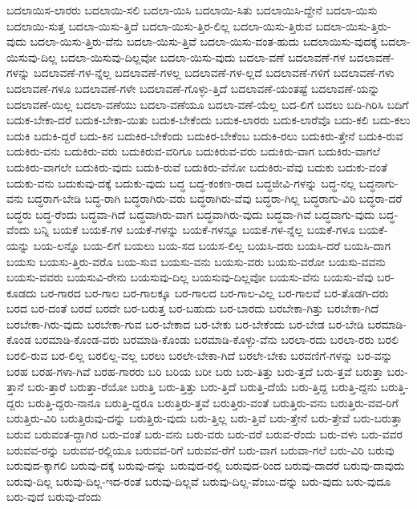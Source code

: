 {ಬದಲಾಯಿಸ-ಲಾರರು
ಬದಲಾಯಿ-ಸಲಿ
ಬದಲಾ-ಯಿಸಿ
ಬದಲಾಯಿ-ಸಿತು
ಬದಲಾಯಿಸಿ-ದ್ದೇನೆ
ಬದಲಾ-ಯಿಸು
ಬದಲಾಯಿ-ಸುತ್ತ
ಬದಲಾ-ಯಿಸು-ತ್ತಿದೆ
ಬದಲಾ-ಯಿಸು-ತ್ತಿರ-ಲಿಲ್ಲ
ಬದಲಾ-ಯಿಸು-ತ್ತಿರುವ
ಬದಲಾ-ಯಿಸು-ತ್ತಿರು-ವುದು
ಬದಲಾ-ಯಿಸು-ತ್ತಿರು-ವೆನು
ಬದಲಾ-ಯಿಸು-ತ್ತಿವೆ
ಬದಲಾ-ಯಿಸು-ವಂತ-ಹುದು
ಬದಲಾಯಿಸು-ವುದಕ್ಕೆ
ಬದಲಾ-ಯಿಸುವು-ದಿಲ್ಲ
ಬದಲಾ-ಯಿಸುವು-ದಿಲ್ಲವೋ
ಬದಲಾ-ಯಿಸು-ವುದು
ಬದಲಾ-ವಣೆ
ಬದಲಾವಣೆ-ಗಳ
ಬದಲಾವಣೆ-ಗಳನ್ನು
ಬದಲಾವಣೆ-ಗಳ-ನ್ನೆಲ್ಲ
ಬದಲಾವಣೆ-ಗಳಲ್ಲ
ಬದಲಾವಣೆ-ಗಳ-ಲ್ಲದೆ
ಬದಲಾವಣೆ-ಗಳಿಗೆ
ಬದಲಾವಣೆ-ಗಳು
ಬದಲಾವಣೆ-ಗಳೂ
ಬದಲಾವಣೆ-ಗಳೇ
ಬದಲಾವಣೆ-ಗೊಳ್ಳು-ತ್ತಿದೆ
ಬದಲಾವಣೆ-ಯಂತಷ್ಟೆ
ಬದಲಾವಣೆ-ಯನ್ನು
ಬದಲಾವಣೆ-ಯಿಲ್ಲ
ಬದಲಾ-ವಣೆಯು
ಬದಲಾ-ವಣೆಯೂ
ಬದಲಾ-ವಣೆ-ಯೆಲ್ಲ
ಬದ-ಲಿಗೆ
ಬದಲು
ಬದಿ-ಗಿರಿಸಿ
ಬದಿಗೆ
ಬದುಕ-ಬೇಕಾ-ದರೆ
ಬದುಕ-ಬೇಕಾ-ಯಿತು
ಬದುಕ-ಬೇಕೆಂದು
ಬದುಕ-ಲಾರರು
ಬದುಕ-ಲಾರೆವೊ
ಬದು-ಕಲಿ
ಬದು-ಕಲು
ಬದುಕಿ
ಬದುಕಿ-ದ್ದರೆ
ಬದು-ಕಿನ
ಬದುಕಿರ-ಬೇಕೆಂದು
ಬದುಕಿರ-ಬೇಕೆಂಬ
ಬದುಕಿ-ರಲು
ಬದುಕಿರು-ತ್ತೇನೆ
ಬದುಕಿ-ರುವ
ಬದುಕಿರು-ವನು
ಬದುಕಿರು-ವರು
ಬದುಕಿರುವ-ವರಿಗೂ
ಬದುಕಿರುವ-ವರು
ಬದುಕಿರು-ವಾಗ
ಬದುಕಿರು-ವಾಗಲೆ
ಬದುಕಿರು-ವಾಗಲೇ
ಬದುಕಿರು-ವುದು
ಬದುಕಿ-ರುವೆ
ಬದುಕಿರು-ವೆನೋ
ಬದುಕಿರು-ವೆವು
ಬದುಕು
ಬದುಕು-ವಂತೆ
ಬದುಕು-ವನು
ಬದುಕುವು-ದಕ್ಕೆ
ಬದುಕು-ವುದು
ಬದ್ಧ
ಬದ್ಧ-ಕಂಕಣ-ರಾದ
ಬದ್ಧಜೀವಿ-ಗಳನ್ನು
ಬದ್ಧ-ನಲ್ಲ
ಬದ್ಧನಾಗು-ವನು
ಬದ್ಧರಾಗ-ಬೇಡಿ
ಬದ್ಧ-ರಾಗಿ
ಬದ್ಧರಾಗಿರು-ವರು
ಬದ್ಧರಾಗಿರು-ವೆವು
ಬದ್ಧರಾ-ಗಿಲ್ಲ
ಬದ್ಧರಾಗು-ವಿರಿ
ಬದ್ಧರಾ-ದರೆ
ಬದ್ಧರು
ಬದ್ಧ-ರೆಂದು
ಬದ್ಧವಾ-ಗಿದೆ
ಬದ್ಧವಾಗಿರು-ವಾಗ
ಬದ್ಧವಾಗಿರು-ವುದು
ಬದ್ಧವಾ-ಗಿವೆ
ಬದ್ಧವಾಗು-ವುದು
ಬದ್ಧ-ವೆಂದು
ಬನ್ನಿ
ಬಯಕೆ
ಬಯಕೆ-ಗಳ
ಬಯಕೆ-ಗಳನ್ನು
ಬಯಕೆ-ಗಳನ್ನೂ
ಬಯಕೆ-ಗಳ-ನ್ನೆಲ್ಲ
ಬಯಕೆ-ಗಳೂ
ಬಯಕೆ-ಯನ್ನು
ಬಯ-ಲನ್ನೊ
ಬಯ-ಲಿಗೆ
ಬಯಲು
ಬಯ-ಸದ
ಬಯಸ-ಲಿಲ್ಲ
ಬಯಸಿ-ದರು
ಬಯಸಿ-ದರೆ
ಬಯಸಿ-ದಾಗ
ಬಯಸು
ಬಯಸು-ತ್ತಿರು-ವರೊ
ಬಯ-ಸುವ
ಬಯಸು-ವನು
ಬಯಸು-ವರು
ಬಯಸು-ವರೋ
ಬಯಸು-ವವನು
ಬಯಸು-ವವರು
ಬಯಸುವಿ-ರೇನು
ಬಯಸುವು-ದಿಲ್ಲ
ಬಯಸುವು-ದಿಲ್ಲವೋ
ಬಯಸು-ವೆನು
ಬಯಸು-ವೆವು
ಬರ-ಕೂಡದು
ಬರ-ಗಾರದ
ಬರ-ಗಾಲ
ಬರ-ಗಾಲಕ್ಕೂ
ಬರ-ಗಾಲದ
ಬರ-ಗಾಲ-ವಿಲ್ಲ
ಬರ-ಗಾಲವೆ
ಬರ-ತೊಡಗಿ-ದರು
ಬರದ
ಬರ-ದಂತೆ
ಬರದೆ
ಬರದೇ
ಬರ-ಬರುತ್ತ
ಬರ-ಬಹುದು
ಬರ-ಬಾರದು
ಬರಬೇಕಾ-ಗಿತ್ತು
ಬರಬೇಕಾ-ಗಿದೆ
ಬರಬೇಕಾ-ಗಿರು-ವುದು
ಬರಬೇಕಾ-ಗುವ
ಬರ-ಬೇಕಾದ
ಬರ-ಬೇಕು
ಬರ-ಬೇಕೆಂದು
ಬರ-ಬೇಡ
ಬರ-ಬೇಡಿ
ಬರಮಾಡಿ-ಕೊಂಡ
ಬರಮಾಡಿ-ಕೊಂಡ-ವರು
ಬರಮಾಡಿ-ಕೊಂಡು
ಬರಮಾಡಿ-ಕೊಳ್ಳು-ವೆನು
ಬರಲಾ-ರದು
ಬರಲಾ-ರರು
ಬರಲಿ
ಬರಲಿ-ರುವ
ಬರ-ಲಿಲ್ಲ
ಬರಲಿಲ್ಲ-ವಲ್ಲ
ಬರಲು
ಬರಲೇ-ಬೇಕಾ-ಗಿದೆ
ಬರಲೇ-ಬೇಕು
ಬರವಣಿಗೆ-ಗಳನ್ನು
ಬರ-ವನ್ನು
ಬರಹ
ಬರಹ-ಗಳಾ-ಗಿವೆ
ಬರಹ-ಗಾರರು
ಬರಿ
ಬರಿಯ
ಬರೀ
ಬರು
ಬರು-ತಿತ್ತು
ಬರು-ತ್ತದೆ
ಬರು-ತ್ತವೆ
ಬರುತ್ತಾ
ಬರು-ತ್ತಾನೆ
ಬರು-ತ್ತಾರೆ
ಬರುತ್ತಾ-ರೆಯೋ
ಬರುತ್ತಿ
ಬರು-ತ್ತಿತ್ತು
ಬರು-ತ್ತಿದೆ
ಬರುತ್ತಿ-ದೆಯೆ
ಬರು-ತ್ತಿದ್ದ
ಬರುತ್ತಿ-ದ್ದನು
ಬರುತ್ತಿ-ದ್ದರು
ಬರುತ್ತಿ-ದ್ದರು-ನಾನೂ
ಬರುತ್ತಿ-ದ್ದರೂ
ಬರುತ್ತಿರು-ತ್ತವೆ
ಬರುತ್ತಿರು-ವಂತೆ
ಬರುತ್ತಿರು-ವನು
ಬರುತ್ತಿರು-ವವ-ರಿಗೆ
ಬರುತ್ತಿರು-ವಿರಿ
ಬರುತ್ತಿರುವು-ದನ್ನು
ಬರುತ್ತಿರು-ವುದು
ಬರು-ತ್ತಿಲ್ಲ
ಬರು-ತ್ತಿವೆ
ಬರು-ತ್ತೇನೆ
ಬರು-ತ್ತೇವೆ
ಬರು-ಬರುತ್ತಾ
ಬರುವ
ಬರುವಂತ-ದ್ದಾಗಿರ
ಬರು-ವಂತೆ
ಬರು-ವನು
ಬರು-ವರು
ಬರು-ವರೆ
ಬರುವ-ರೆಂದು
ಬರು-ವಳು
ಬರು-ವವರ
ಬರುವವ-ರನ್ನು
ಬರುವವ-ರಲ್ಲಿಯೂ
ಬರುವವ-ರಿಗೆ
ಬರುವವ-ರೆಗೆ
ಬರು-ವಾಗ
ಬರುವಾ-ಗಲೆ
ಬರು-ವಿರಿ
ಬರುವು
ಬರುವುದ-ಕ್ಕಾಗಲಿ
ಬರುವು-ದಕ್ಕೆ
ಬರುವು-ದನ್ನು
ಬರುವುದ-ರಲ್ಲಿ
ಬರುವುದ-ರಿಂದ
ಬರುವು-ದಾದರೆ
ಬರುವು-ದಾವುದು
ಬರುವು-ದಿಲ್ಲ
ಬರುವು-ದಿಲ್ಲ-ಇದ-ರಂತೆ
ಬರುವು-ದಿಲ್ಲವೆ
ಬರುವು-ದಿಲ್ಲ-ವೆಂಬು-ದನ್ನು
ಬರು-ವುದು
ಬರು-ವುದೂ
ಬರು-ವುದೆ
ಬರುವು-ದೆಂದು
}

